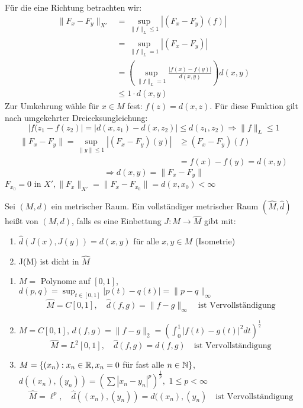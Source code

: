 \begin{beweis}
	Für die eine Richtung betrachten wir:
	\begin{align*}
		\| F_{x} - F_{y} \|_{X'}  & = \sup_{\| f \|_{L} \leq 1} |(F_{x} - F_{y})(f)| \\
								  & = \sup_{\| f \|_{L} = 1} |(F_{x} - F_{y})| \\
								  & = \left( \sup_{\| f \|_{L} = 1} \frac{|f(x) - f(y)|}{d(x, y)} \right) d(x, y) \\
								  & \leq 1 \cdot d(x, y)
	\end{align*}
	Zur Umkehrung wähle für $x \in M$ fest: $f(z) = d(x, z)$. Für diese Funktion gilt nach umgekehrter Dreiecksungleichung: \\
	\[ |f(z_{1} - f(z_{2})| = | d(x, z_{1}) - d(x, z_{2}) | \leq d(z_{1}, z_{2}) \Rightarrow \| f \|_{L} \leq 1 \]
	\begin{align*}
		\| F_{x} - F_{y} \| = \sup_{\|y \| \leq 1} |(F_{x} - F_{y})(y)| & \geq (F_{x} - F_{y})(f) \\
																		& = f(x) - f(y) = d(x, y)
	\end{align*}
	\[ \Rightarrow d(x, y) = \| F_{x} - F_{y} \| \]
	$F_{x_{0}} = 0$ in $X', \| F_{x} \|_{X'} = \| F_{x} - F_{x_{0}} \| = d(x, x_{0}) < \infty$
\end{beweis}


\begin{definition}
	Sei $(M, d)$ ein metrischer Raum. Ein vollständiger metrischer Raum $(\hat M, \hat d)$ hei{\ss}t  von $(M, d)$, falls es eine Einbettung $J \colon M \rightarrow \hat M$ gibt mit:
	\begin{enumerate}[label=\roman*\upshape)]
		\item $\hat d (J(x), J(y)) = d(x, y)$ für alle $x, y \in M$ (Isometrie)
		\item J(M) ist dicht in $\hat{M}$
	\end{enumerate}
\end{definition}


\begin{beispiel}
	\begin{enumerate}[label=\alph*\upshape)]	
		\item $M =$ Polynome auf $[0, 1]$, $d(p, q) = \sup_{t \in [0, 1]} |p(t) - q(t)| = \| p - q \|_{\infty}$
			\[ \hat M = C[0, 1], \quad \hat d(f, g)= \| f - g \|_{\infty} \quad \text{ist Vervollständigung} \]
		\item $M = C[0, 1]$, $d(f, g) = \|f - g\|_{2} = \left( \int_{0}^{1} |f(t) - g(t)|^{2} dt \right)^{\frac{1}{2}}$
			\[ \hat M = L^{2}[0, 1], \quad \hat d(f, g) = d(f, g) \quad \text{ist Vervollständigung} \]
		\item $M = \{ (x_{n}): x_{n} \in \mathbb{R}, x_{n} = 0$ für fast alle $n \in \mathbb{N} \}$, $d((x_{n}), (y_{n})) = \left( \sum |x_{n} - y_{n}|^{p} \right)^{\frac{1}{p}},$ $1 \leq p < \infty$
			\[ \hat M = \ell^{p}, \quad \hat d((x_{n}), (y_{n})) = d((x_{n}), (y_{n}) \quad \text{ist Vervollständigung} \]
	\end{enumerate}
\end{beispiel}


